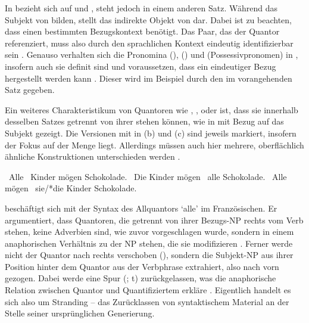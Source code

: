 In  bezieht sich  auf  und ,
steht jedoch in einem anderen Satz. Während  das Subjekt
von  bilden, stellt  das indirekte Objekt von
 dar. Dabei ist zu beachten, dass  einen
bestimmten Bezugskontext benötigt. Das Paar, das der Quantor
referenziert, muss also durch den sprachlichen Kontext eindeutig
identifizierbar sein
\autocites[vgl.~z.\,B.][274]{lyons1999}[788]{schwartz2000}[983]{janssen2004}.
Genauso verhalten sich die Pronomina  (),
 () und  (Possessivpronomen) in
, insofern auch sie definit sind und
voraussetzen, dass ein eindeutiger Bezug hergestellt werden kann
\autocites[vgl.][145--148]{lyons1999}. Dieser wird im Beispiel durch den
 im vorangehenden Satz gegeben.

Ein weiteres Charakteristikum von Quantoren wie ,
,  oder  ist, dass sie innerhalb desselben
Satzes getrennt von ihrer  stehen können, wie in
 mit Bezug auf das Subjekt gezeigt. Die Versionen mit
 in (b) und (c) sind jeweils markiert,
insofern der Fokus auf der Menge liegt. Allerdings müssen auch hier mehrere,
oberflächlich ähnliche Konstruktionen unterschieden werden
\autocites[27--28]{pittner1995}[65--67]{fanselowcavar2002}.

\begin{exe}
\ex \label{ex:floatsubj}
\begin{xlist}
	\ex \label{ex:floatsubj_1}
		{\ob}~Alle {\ob}~Kinder{\cb}{\cb} mögen Schokolade.
	\ex \label{ex:floatsubj_2}
		{\ob}~Die Kinder{\cb} mögen {\ob}~alle{\cb}
		Schokolade.
	\ex \label{ex:floatsubj_3}
		{\ob}~Alle{\cb} mögen {\ob}~sie/*die
		Kinder{\cb} Schokolade.
\end{xlist}
\end{exe}

\citet{sportiche1988} beschäftigt sich mit der Syntax des Allquantors 
`alle' im Französischen. Er argumentiert, dass Quantoren, die
getrennt von ihrer Bezugs-NP rechts vom Verb stehen, keine
Adverbien sind, wie zuvor vorgeschlagen wurde, sondern in einem
anaphorischen Verhältnis zu der NP stehen, die sie modifizieren
\autocite[428--433]{sportiche1988}. Ferner werde nicht der Quantor nach rechts
verschoben (), sondern die Subjekt-NP aus ihrer Position hinter
dem Quantor aus der Verbphrase extrahiert, also nach vorn gezogen. Dabei werde
eine Spur (; t) zurückgelassen, was die anaphorische
Relation zwischen Quantor und Quantifiziertem erkläre
\autocite[432--433]{sportiche1988}. Eigentlich handelt es sich also um
Stranding -- das Zurücklassen von syntaktischem Material an der Stelle seiner
ursprünglichen Generierung.

